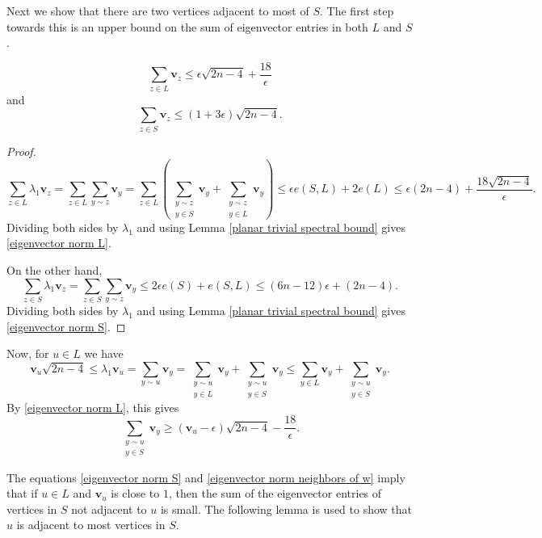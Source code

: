 Next we show that there are two vertices adjacent to most of $S$. The first step towards this is an upper bound on the sum of eigenvector entries in both $L$ and $S$.
\begin{lemma}
\begin{equation}\label{eigenvector norm L}
\sum_{z\in L} \mathbf{v}_z \leq  \epsilon \sqrt{2n-4} + \frac{18}{\epsilon}
\end{equation}
\noindent and
 \begin{equation}\label{eigenvector norm S}
 \sum_{z\in S} \mathbf{v}_z \leq (1+3\epsilon)\sqrt{2n-4}.
 \end{equation}

\end{lemma}
\begin{proof}
\[
\sum_{z\in L} \lambda_1 \mathbf{v}_z = \sum_{z\in L} \sum_{y\sim z} \mathbf{v}_y = \sum_{z\in L}\left( \sum_{\substack{y\sim z \\ y\in S}} \mathbf{v}_y + \sum_{\substack{y\sim z\\ y\in L}} \mathbf{v}_y \right) \leq \epsilon e(S,L) + 2e(L) \leq \epsilon (2n-4) + \frac{18\sqrt{2n-4}}{\epsilon}.
\]
Dividing both sides by $\lambda_1$ and using Lemma \ref{planar trivial spectral bound} gives \eqref{eigenvector norm L}.

 On the other hand,
 \[
 \sum_{z\in S} \lambda_1 \mathbf{v}_z = \sum_{z\in S}\sum_{y\sim z} \mathbf{v}_y \leq 2\epsilon e(S) + e(S,L) \leq (6n-12)\epsilon  + (2n-4).
 \]
 Dividing both sides by $\lambda_1$ and using Lemma \ref{planar trivial spectral bound} gives \eqref{eigenvector norm S}.
 \end{proof}

 Now, for $u\in L$ we have
\[
\mathbf{v}_u\sqrt{2n-4} \leq \lambda_1 \mathbf{v}_u=\sum_{y\sim u} \mathbf{v}_y = \sum_{\substack{y\sim u \\ y\in L}} \mathbf{v}_y + \sum_{\substack{y\sim u\\ y\in S}} \mathbf{v}_y \leq \sum_{y\in L} \mathbf{v}_y + \sum_{\substack{y\sim u \\y\in S}} \mathbf{v}_y.
\]
By \eqref{eigenvector norm L}, this gives
\begin{equation}\label{eigenvector norm neighbors of w}
\sum_{\substack{y\sim u \\ y\in S}} \mathbf{v}_y \geq (\mathbf{v}_u-\epsilon)\sqrt{2n-4} - \frac{18}{\epsilon}.
\end{equation}

 
 The equations \eqref{eigenvector norm S} and \eqref{eigenvector norm neighbors of w} imply that if $u\in L$ and $\mathbf{v}_u$ is close to $1$, then the sum of the eigenvector entries of vertices in $S$ not adjacent to $u$ is small. The following lemma is used to show that $u$ is adjacent to most vertices in $S$.
 
